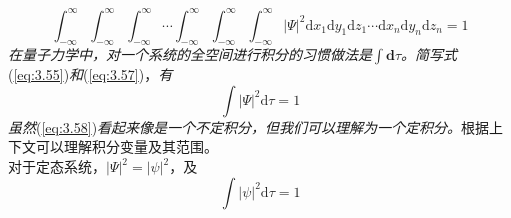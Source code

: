 	\begin{equation}
		\int_{-\infty}^{\infty}\int_{-\infty}^{\infty}\int_{-\infty}^{\infty}\cdots\int_{-\infty}^{\infty}\int_{-\infty}^{\infty}\int_{-\infty}^{\infty}\left|\Psi\right|^2 \mathrm{d}x_1\mathrm{d}y_1\mathrm{d}z_1\cdots\mathrm{d}x_n\mathrm{d}y_n\mathrm{d}z_n = 1
		\label{eq:3.57}
	\end{equation}
	\textit{在量子力学中，对一个系统的全空间进行积分的习惯做法是$\int\mathbf{d}\tau$。简写式}(\ref{eq:3.55})\textit{和}(\ref{eq:3.57})，\textit{有}
	\begin{equation}
		\boxed{
			\int\left|\Psi\right|^2\mathrm{d}\tau = 1
		}
		\label{eq:3.58}
	\end{equation}
	\textit{虽然}(\ref{eq:3.58})\textit{看起来像是一个不定积分，但我们可以理解为一个定积分。}根据上下文可以理解积分变量及其范围。\\
	\indent 对于定态系统，$\left|\Psi\right|^2 = \left|\psi\right|^2$，及
	\begin{equation}
		\boxed{
			\int\left|\psi\right|^2\mathrm{d}\tau = 1
		}
		\label{eq:3.59}
	\end{equation}
	
